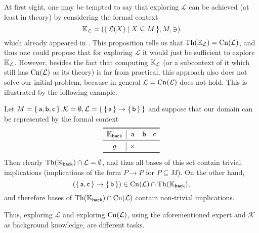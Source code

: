At first sight, one may be tempted to say that exploring $\mathcal{L}$ can be achieved (at
least in theory) by considering the formal context
\begin{equation*}
  {\ensuremath{\mathbb{K}}}_{\mathcal{L}} = ({\{\, \mathcal{L}(X) \mid X \subseteq M \,\}}, M, \ni)
\end{equation*}
which already appeared in .  This proposition
tells us that $\operatorname{Th}({\mathbb{K}}_{\mathcal{L}}) = \operatorname{Cn}(\mathcal{L})$, and thus one could propose
that for exploring $\mathcal{L}$ it would just be sufficient to explore ${\mathbb{K}}_{\mathcal{L}}$.  However, besides the fact that computing ${\mathbb{K}}_{\mathcal{L}}$ (or a
subcontext of it which still has $\operatorname{Cn}(\mathcal{L})$ as its theory) is far from practical,
this approach also does not solve our initial problem, because in general $\mathcal{L} =
\operatorname{Cn}(\mathcal{L})$ does not hold.  This is illustrated by the following example.

\begin{Example}
  \label{expl:why-exploring-implications-is-different}
  Let $M = {\{\, \mathsf{a}, \mathsf{b}, \mathsf{c} \,\}}, \mathcal{K} = \emptyset,
  \mathcal{L} = {\{\, {\{\, \mathsf{a} \,\}} \to {\ensuremath{\{\, \mathsf{b} \,\}}} \,\}}$ and suppose that our
  domain can be represented by the formal context
  \begin{equation*}
    \begin{array}{c|ccc}
      \toprule
      \con K_{\mathsf{back}} & \mathsf{a} & \mathsf{b} & \mathsf{c} \\
      \midrule
      g & \times \\
      \bottomrule
    \end{array}
  \end{equation*}
  Then clearly $\operatorname{Th}({\mathbb{K}}_{\mathsf{back}}) \cap \mathcal{L} = \emptyset$, and thus all
  bases of this set contain trivial implications (\ie implications of the form $P \to P$
  for $P \subseteq M$).  On the other hand,
  \begin{equation*}
    ({\{\, \mathsf{a}, \mathsf{c} \,\}} \to {\ensuremath{\{\, \mathsf{b} \,\}}}) \in
    \operatorname{Cn}(\mathcal{L}) \cap \operatorname{Th}({\mathbb{K}}_{\mathsf{back}}),
  \end{equation*}
  and therefore bases of $\operatorname{Th}({\mathbb{K}}_{\mathsf{back}}) \cap \operatorname{Cn}(\mathcal{L})$ contain
  non-trivial implications.

  Thus, exploring $\mathcal{L}$ and exploring $\operatorname{Cn}(\mathcal{L})$, using the aforementioned
  expert and $\mathcal{K}$ as background knowledge, are different tasks.
\end{Example}

